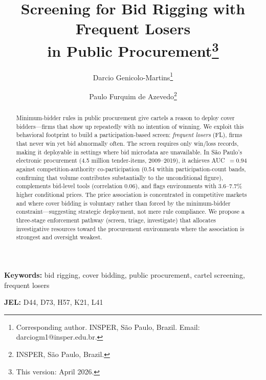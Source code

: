 \title{Screening for Bid Rigging with Frequent Losers\\in Public Procurement\thanks{This version: April 2026.}}

\author{Darcio Genicolo-Martins\thanks{Corresponding author. INSPER, S\~ao Paulo, Brazil. Email: darciogm1@insper.edu.br.} \and Paulo Furquim de Azevedo\thanks{INSPER, S\~ao Paulo, Brazil.}}

\date{}

\maketitle

\begin{abstract}
\noindent
Minimum-bidder rules in public procurement give cartels a reason to
deploy cover bidders---firms that show up repeatedly with no
intention of winning. We exploit this behavioral footprint to build
a participation-based screen: \emph{frequent losers} (FL), firms
that never win yet bid abnormally often. The screen requires only
win/loss records, making it deployable in settings where bid
microdata are unavailable. In S\~ao Paulo's electronic procurement
(4.5 million tender-items, 2009--2019), it achieves
AUC~$= 0.94$ against competition-authority co-participation
(0.54 within participation-count bands, confirming that volume
contributes substantially to the unconditional figure),
complements bid-level tools (correlation 0.06), and flags
environments with 3.6--7.7\% higher conditional prices. The price association is
concentrated in competitive markets and where cover bidding is
voluntary rather than forced by the minimum-bidder
constraint---suggesting strategic deployment, not mere rule
compliance. We propose a three-stage enforcement pathway (screen,
triage, investigate) that allocates investigative resources toward
the procurement environments where the association is strongest and
oversight weakest.
\end{abstract}

\noindent\textbf{Keywords:} bid rigging, cover bidding, public procurement, cartel screening, frequent losers

\noindent\textbf{JEL:} D44, D73, H57, K21, L41

\bigskip
